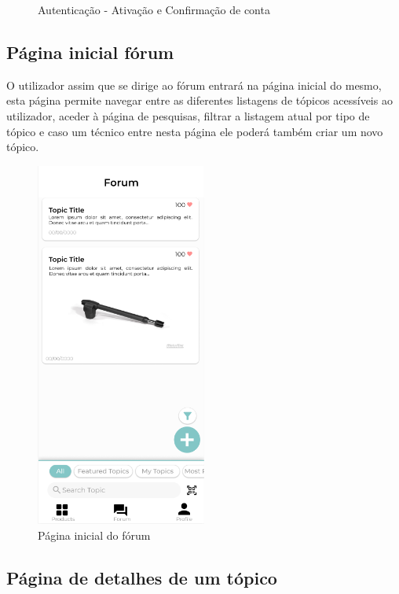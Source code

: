 \begin{figure}[htb]
    \caption{Autenticação - Ativação e Confirmação de conta}%
    \label{fig:17}%
\end{figure}

\newpage

\subsection{Página inicial fórum}

O utilizador assim que se dirige ao fórum entrará na página inicial do mesmo, esta página permite navegar 
entre as diferentes listagens de tópicos acessíveis ao utilizador, aceder à página de pesquisas, filtrar a 
listagem atual por tipo de tópico e caso um técnico entre nesta página ele poderá também criar um novo 
tópico.

\begin{figure}[htb]
    \centering
    \includegraphics[width=0.5\textwidth]{images/mockups/forum_home.png}
    \caption{Página inicial do fórum}
    \label{fig:18}
\end{figure}

\newpage

\subsection{Página de detalhes de um tópico}

